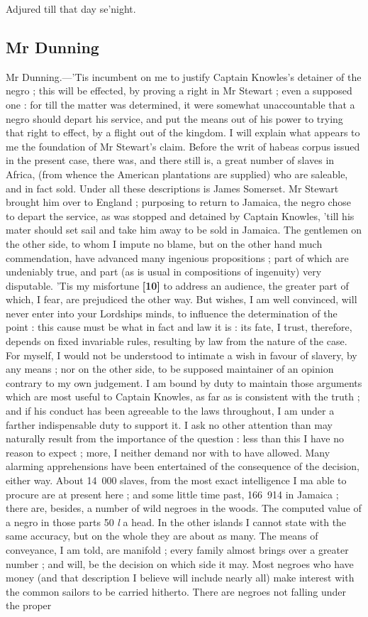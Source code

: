 \documentclass[a4paper]{article}
\begin{document}
Adjured till that day se'night.

\subsection{Mr Dunning}
Mr Dunning.---'Tis incumbent on me to justify Captain Knowles's detainer of the negro ; this will be effected, by proving a right in Mr Stewart ; even a supposed one : for till the matter was determined, it were somewhat unaccountable that a negro should depart his service, and put the means out of his power to trying that right to effect, by a flight out of the kingdom. I will explain what appears to me the foundation of Mr Stewart's claim. Before the writ of habeas corpus issued in the present case, there was, and there still is, a great number of slaves in Africa, (from whence the American plantations are supplied) who are saleable, and in fact sold. Under all these descriptions is James Somerset. Mr Stewart brought him over to England ; purposing to return to Jamaica, the negro chose to depart the service, as was stopped and detained by Captain Knowles, 'till his mater should set sail and take him away to be sold in Jamaica. The gentlemen on the other side, to whom I impute no blame, but on the other hand much commendation, have advanced many ingenious propositions ; part of which are undeniably true, and part (as is usual in compositions of ingenuity) very disputable. 'Tis my misfortune \textbf{[10]} to address an audience, the greater part of which, I fear, are prejudiced the other way. But wishes, I am well convinced, will never enter into your Lordships minds, to influence the determination of the point : this cause must be what in fact and law it is : its fate, I trust, therefore, depends on fixed invariable rules, resulting by law from the nature of the case. For myself, I would not be understood to intimate a wish in favour of slavery, by any means ; nor on the other side, to be supposed maintainer of an opinion contrary to my own judgement. I am bound by duty to maintain those arguments which are most useful to Captain Knowles, as far as is consistent with the truth ; and if his conduct has been agreeable to the laws throughout, I am under a farther indispensable duty to support it. I ask no other attention than may naturally result from the importance of the question : less than this I have no reason to expect ; more, I neither demand nor with to have allowed. Many alarming apprehensions have been entertained of the consequence of the decision, either way. About 14~000 slaves, from the most exact intelligence I ma able to procure are at present here ; and some little time past,  166~914 in Jamaica ; there are, besides, a number of wild negroes in the woods. The computed value of a negro in those parts 50 \emph{l} a head. In the other islands I cannot state with the same accuracy, but on the whole they are about as many. The means of conveyance, I am told, are manifold ; every family almost brings over a greater number ; and will, be the decision on which side it may. Most negroes who have money (and that description I believe will include nearly all) make interest with the common sailors to be carried hitherto. There are negroes not falling under the proper 
\end{document}
